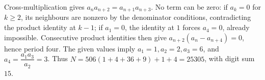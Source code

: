 Cross-multiplication gives $a_na_{n+2}=a_{n+1}a_{n+3}$. No term can be zero: if $a_k=0$ for $k\ge2$, its neighbours are nonzero by the denominator conditions, contradicting the product identity at $k-1$; if $a_1=0$, the identity at $1$ forces $a_4=0$, already impossible. Consecutive product identities then give $a_{n+2}(a_n-a_{n+4})=0$, hence period four. The given values imply $a_1=1,a_2=2,a_3=6$, and $a_4=\dfrac{a_1a_3}{a_2}=3$. Thus $N=506(1+4+36+9)+1+4=25305$, with digit sum $\boxed{15}$.
